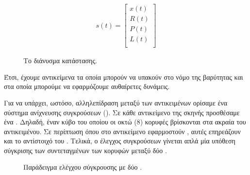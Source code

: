 \documentclass[11pt]{scrartcl} %
\begin{document}
\begin{figure}[H]
\begin{gather}
    s(t)
     =
  \begin{bmatrix}
      x(t) \\
      R(t) \\ 
      P(t) \\
      L(t) \\
   \end{bmatrix}
\end{gather}
    \caption{Το διάνυσμα κατάστασης.}
\end{figure}

Έτσι, έχουμε αντικείμενα τα οποία μπορούν να υπακούν στο νόμο της βαρύτητας και στα οποία μπορούμε να 
εφαρμόζουμε αυθαίρετες δυνάμεις.

Για να υπάρχει, ωστόσο, αλληλεπίδραση μεταξύ των αντικειμένων ορίσαμε ένα σύστημα ανίχνευσης συγκρούσεων (). 
Σε κάθε αντικείμενο της σκηνής προσθέσαμε ένα . Δηλαδή, έναν κύβο του οποίου 
οι οκτώ (8) κορυφές βρίσκονται στα ακραία  του αντικειμένου. 
Σε περίπτωση όπου στο αντικείμενο εφαρμοστούν , αυτές επηρεάζουν και το αντίστοιχό του .
Τελικά, ο έλεγχος συγκρούσεων γίνεται απλά μία υπόθεση σύγκρισης των συντεταγμένων των κορυφών μεταξύ δύο .

\begin{figure}[H]
    \begin{center}
    \end{center}
    \caption{Παράδειγμα ελέγχου σύγκρουσης με δύο .}
\end{figure}
\end{document}
